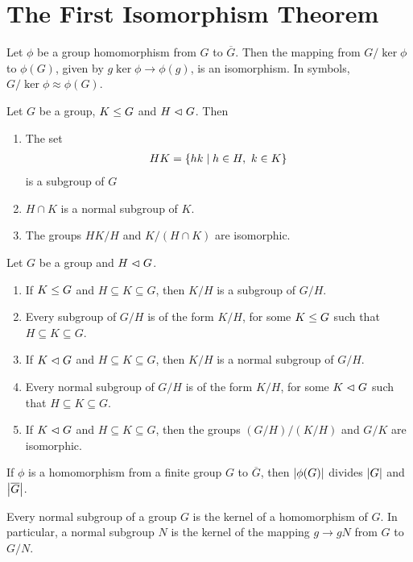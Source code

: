 \section{The First Isomorphism Theorem}

\begin{theorem}
	Let $\phi$ be a group homomorphism from $G$ to $\overline{G}$. Then the mapping from $G/\ker\phi$ to $\phi(G)$, given by $g\ker\phi \to \phi(g)$, is an isomorphism. In symbols, $G/\ker\phi \approx \phi(G)$.
\end{theorem}

\begin{theorem}
    Let \(G\) be a group, \(K\leq G\) and \(H\vartriangleleft G\). Then
    \begin{enumerate}[label=(\alph*)]
        \item The set \vspace{-1em}
        \begin{align*}
            HK = \{hk \mid h\in H,\ k\in K\}\vspace{-1em}
        \end{align*}
        is a subgroup of \(G\)
        \item \(H\cap K\) is a normal subgroup of \(K\).
        \item The groups \(HK / H\) and \(K / (H\cap K)\) are isomorphic.
    \end{enumerate}
\end{theorem}

\begin{theorem}
    Let \(G\) be a group and \(H \vartriangleleft G\).
    \begin{enumerate}[label=(\alph*)]
        \item If \(K\leq G\) and \(H \subseteq K\subseteq G\), then \(K / H\) is a subgroup of \(G / H\).
        \item Every subgroup of \(G / H\) is of the form \(K / H\), for some \(K\leq G\) such that \(H \subseteq K\subseteq G\).
        \item If \(K\vartriangleleft G\) and \(H \subseteq K\subseteq G\), then \(K / H\) is a normal subgroup of \(G / H\).
        \item Every normal subgroup of \(G / H\) is of the form \(K / H\), for some \(K\vartriangleleft G\) such that \(H \subseteq K\subseteq G\).
        \item If \(K\vartriangleleft G\) and \(H \subseteq K\subseteq G\), then the groups \((G/H)/(K/H)\) and \(G/K\) are isomorphic.
    \end{enumerate}
\end{theorem}

\begin{corollary}
	If $\phi$ is a homomorphism from a finite group $G$ to $\overline{G}$, then $\left\lvert \phi(G) \right\rvert$ divides $\left\lvert G \right\rvert$ and $\left\lvert \overline{G} \right\rvert$.
\end{corollary}

\begin{theorem}
	Every normal subgroup of a group $G$ is the kernel of a homomorphism of $G$. In particular, a normal subgroup $N$ is the kernel of the mapping $g \to gN$ from $G$ to $G/N$.
\end{theorem}
